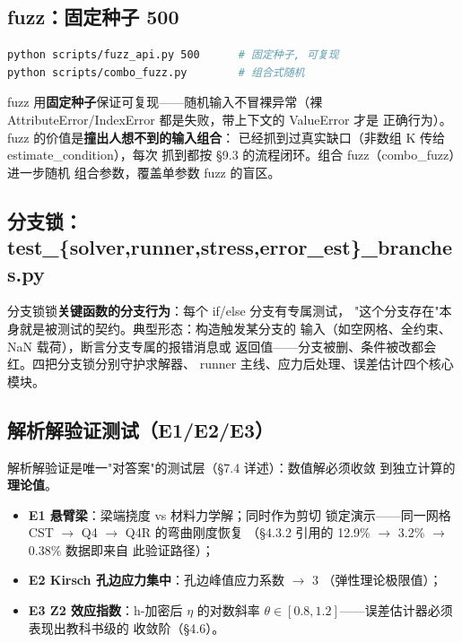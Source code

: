 \documentclass[12pt,a4paper]{ctexart}
\begin{document}
\subsection{fuzz：固定种子 500}

\begin{lstlisting}[language=bash]
python scripts/fuzz_api.py 500      # 固定种子, 可复现
python scripts/combo_fuzz.py        # 组合式随机
\end{lstlisting}

fuzz 用\textbf{固定种子}保证可复现——随机输入不冒裸异常（裸
AttributeError/IndexError 都是失败，带上下文的 ValueError 才是
正确行为）。fuzz 的价值是\textbf{撞出人想不到的输入组合}：
已经抓到过真实缺口（非数组 K 传给 estimate\_condition），每次
抓到都按 §9.3 的流程闭环。组合 fuzz（combo\_fuzz）进一步随机
组合参数，覆盖单参数 fuzz 的盲区。

\subsection{分支锁：test\_\{solver,runner,stress,error\_est\}\_branches.py}

分支锁锁\textbf{关键函数的分支行为}：每个 if/else 分支有专属测试，
"这个分支存在"本身就是被测试的契约。典型形态：构造触发某分支的
输入（如空网格、全约束、NaN 载荷），断言分支专属的报错消息或
返回值——分支被删、条件被改都会红。四把分支锁分别守护求解器、
runner 主线、应力后处理、误差估计四个核心模块。

\subsection{解析解验证测试（E1/E2/E3）}

解析解验证是唯一"对答案"的测试层（§7.4 详述）：数值解必须收敛
到独立计算的\textbf{理论值}。

\begin{itemize}[leftmargin=*]
  \item \textbf{E1 悬臂梁}：梁端挠度 vs 材料力学解；同时作为剪切
        锁定演示——同一网格 CST $\to$ Q4 $\to$ Q4R 的弯曲刚度恢复
        （§4.3.2 引用的 12.9\% $\to$ 3.2\% $\to$ 0.38\% 数据即来自
        此验证路径）；
  \item \textbf{E2 Kirsch 孔边应力集中}：孔边峰值应力系数 $\to$ 3
        （弹性理论极限值）；
  \item \textbf{E3 Z2 效应指数}：h-加密后 $\eta$ 的对数斜率
        $\theta \in [0.8, 1.2]$——误差估计器必须表现出教科书级的
        收敛阶（§4.6）。
\end{itemize}
\end{document}
